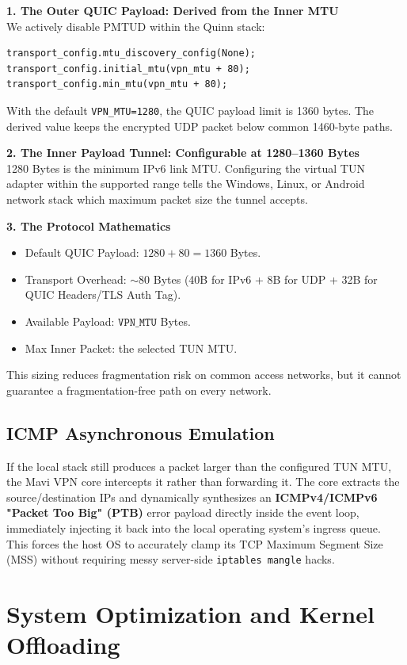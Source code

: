 \documentclass[11pt,a4paper]{article}
\begin{document}
\textbf{1. The Outer QUIC Payload: Derived from the Inner MTU}\\
We actively disable PMTUD within the Quinn stack:
\begin{lstlisting}
transport_config.mtu_discovery_config(None); 
transport_config.initial_mtu(vpn_mtu + 80);
transport_config.min_mtu(vpn_mtu + 80);
\end{lstlisting}
With the default \texttt{VPN\_MTU=1280}, the QUIC payload limit is 1360 bytes. The derived value keeps the encrypted UDP packet below common 1460-byte paths.

\textbf{2. The Inner Payload Tunnel: Configurable at 1280--1360 Bytes}\\
1280 Bytes is the minimum IPv6 link MTU. Configuring the virtual TUN adapter within the supported range tells the Windows, Linux, or Android network stack which maximum packet size the tunnel accepts.

\textbf{3. The Protocol Mathematics}
\begin{itemize}
    \item Default QUIC Payload: $1280 + 80 = 1360$ Bytes.
    \item Transport Overhead: $\sim$80 Bytes (40B for IPv6 + 8B for UDP + 32B for QUIC Headers/TLS Auth Tag).
    \item Available Payload: $\texttt{VPN\_MTU}$ Bytes.
    \item Max Inner Packet: the selected TUN MTU.
\end{itemize}
This sizing reduces fragmentation risk on common access networks, but it cannot guarantee a fragmentation-free path on every network.

\subsection{ICMP Asynchronous Emulation}
If the local stack still produces a packet larger than the configured TUN MTU, the Mavi VPN core intercepts it rather than forwarding it.
The core extracts the source/destination IPs and dynamically synthesizes an \textbf{ICMPv4/ICMPv6 "Packet Too Big" (PTB)} error payload directly inside the event loop, immediately injecting it back into the local operating system's ingress queue. This forces the host OS to accurately clamp its TCP Maximum Segment Size (MSS) without requiring messy server-side \texttt{iptables mangle} hacks.

\section{System Optimization and Kernel Offloading}
\end{document}
